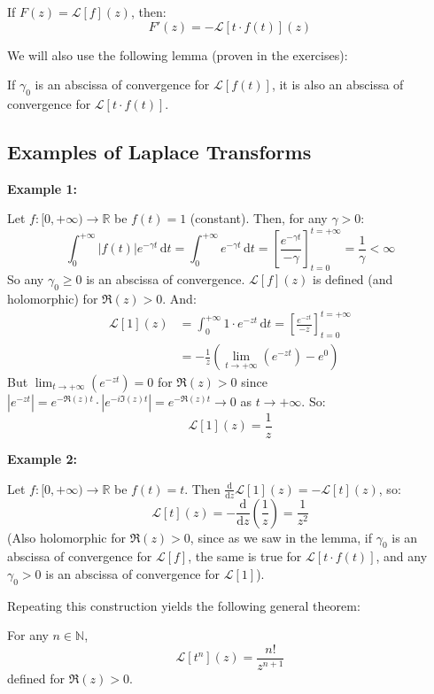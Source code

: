 \begin{theorem}
If $F(z) = \mathcal{L}[f](z)$, then:
\begin{equation}
    F'(z) = -\mathcal{L}[t \cdot f(t)](z)
\end{equation}
\end{theorem}

We will also use the following lemma (proven in the exercises):
\begin{theorem}
If $\gamma_0$ is an abscissa of convergence for $\mathcal{L}[f(t)]$, it is also an abscissa of convergence for $\mathcal{L}[t \cdot f(t)]$.
\end{theorem}

\subsection{Examples of Laplace Transforms}

\textbf{Example 1:}

Let $f: [0, +\infty) \to \mathbb{R}$ be $f(t) = 1$ (constant). Then, for any $\gamma > 0$:
\begin{equation*}
    \int_0^{+\infty} |f(t)| e^{-\gamma t} \,\mathrm{d}t = \int_0^{+\infty} e^{-\gamma t} \,\mathrm{d}t = \left[ \frac{e^{-\gamma t}}{-\gamma} \right]_{t=0}^{t=+\infty} = \frac{1}{\gamma} < \infty
\end{equation*}
So any $\gamma_0 \ge 0$ is an abscissa of convergence. $\mathcal{L}[f](z)$ is defined (and holomorphic) for $\Re(z) > 0$. And:
\begin{align*}
    \mathcal{L}[1](z) &= \int_0^{+\infty} 1 \cdot e^{-zt} \,\mathrm{d}t = \left[ \frac{e^{-zt}}{-z} \right]_{t=0}^{t=+\infty} \\
    &= -\frac{1}{z} \left( \lim_{t \to +\infty} (e^{-zt}) - e^0 \right)
\end{align*}
But $\lim_{t \to +\infty} (e^{-zt}) = 0$ for $\Re(z) > 0$ since $|e^{-zt}| = e^{-\Re(z)t} \cdot |e^{-i\Im(z)t}| = e^{-\Re(z)t} \to 0$ as $t \to +\infty$. So:
\begin{equation*}
    \mathcal{L}[1](z) = \frac{1}{z}
\end{equation*}

\textbf{Example 2:}

Let $f: [0, +\infty) \to \mathbb{R}$ be $f(t) = t$.
Then $\frac{\mathrm{d}}{\mathrm{d}z} \mathcal{L}[1](z) = -\mathcal{L}[t](z)$, so:
\begin{equation*}
    \mathcal{L}[t](z) = -\frac{\mathrm{d}}{\mathrm{d}z} \left( \frac{1}{z} \right) = \frac{1}{z^2}
\end{equation*}
(Also holomorphic for $\Re(z) > 0$, since as we saw in the lemma, if $\gamma_0$ is an abscissa of convergence for $\mathcal{L}[f]$, the same is true for $\mathcal{L}[t \cdot f(t)]$, and any $\gamma_0 > 0$ is an abscissa of convergence for $\mathcal{L}[1]$).

Repeating this construction yields the following general theorem:

\begin{theorem}
For any $n \in \mathbb{N}$, 
\begin{equation*}
    \mathcal{L}[t^n](z) = \frac{n!}{z^{n+1}}
\end{equation*}
defined for $\Re(z) > 0$.
\end{theorem}